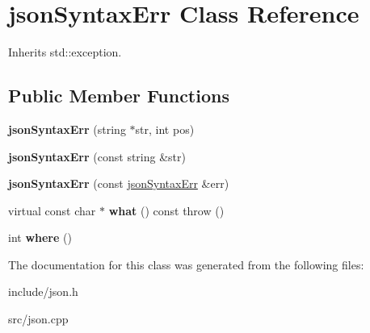 \hypertarget{classjsonSyntaxErr}{\section{json\-Syntax\-Err \-Class \-Reference}
\label{classjsonSyntaxErr}
}


\-Inherits std\-::exception.

\subsection*{\-Public \-Member \-Functions}
\begin{DoxyCompactItemize}
\item 
\hypertarget{classjsonSyntaxErr_a87fcf3fd6f151348f672e4cda7165dc4}{{\bfseries json\-Syntax\-Err} (string $\ast$str, int pos)}\label{classjsonSyntaxErr_a87fcf3fd6f151348f672e4cda7165dc4}

\item 
\hypertarget{classjsonSyntaxErr_a0b813f74b12ae38a56e26296c061c102}{{\bfseries json\-Syntax\-Err} (const string \&str)}\label{classjsonSyntaxErr_a0b813f74b12ae38a56e26296c061c102}

\item 
\hypertarget{classjsonSyntaxErr_a5bd0a9237e264abd5beef0298eaf3892}{{\bfseries json\-Syntax\-Err} (const \hyperlink{classjsonSyntaxErr}{json\-Syntax\-Err} \&err)}\label{classjsonSyntaxErr_a5bd0a9237e264abd5beef0298eaf3892}

\item 
\hypertarget{classjsonSyntaxErr_ae2a6a095f5ac205988a8f2a336e548ab}{virtual const char $\ast$ {\bfseries what} () const   throw ()}\label{classjsonSyntaxErr_ae2a6a095f5ac205988a8f2a336e548ab}

\item 
\hypertarget{classjsonSyntaxErr_ab0f3b55e8e23212d82f80730fc171ff4}{int {\bfseries where} ()}\label{classjsonSyntaxErr_ab0f3b55e8e23212d82f80730fc171ff4}

\end{DoxyCompactItemize}


\-The documentation for this class was generated from the following files\-:\begin{DoxyCompactItemize}
\item 
include/json.\-h\item 
src/json.\-cpp\end{DoxyCompactItemize}
